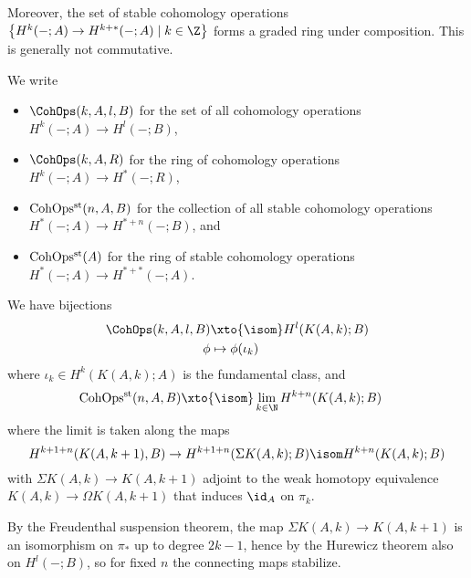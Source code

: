 Moreover, the set of stable cohomology operations $\big\{H^k({{-}}; A) \to H^{k + *}({{-}}; A) \mid k \in \Z\big\}$ forms a graded ring under composition.
This is generally not commutative.
\begin{notation}
	We write
	\begin{itemize}
		\item $\CohOps(k, A, l, B)$ for the set of all cohomology operations $H^k({{-}}; A) \to H^l({{-}}; B)$,
		\item $\CohOps(k, A, R)$ for the ring of cohomology operations $H^k({{-}}; A) \to H^*({{-}}; R)$,
		\item $\operatorname{CohOps^{\mathrm{st}}}(n, A, B)$ for the collection of all stable cohomology operations $H^*({{-}}; A) \to H^{* + n}({{-}}; B)$, and
		\item $\operatorname{CohOps^{\mathrm{st}}}(A)$ for the ring of stable cohomology operations $H^*({{-}}; A) \to H^{* + *}({{-}}; A)$.
	\end{itemize}
\end{notation}
\begin{proposition}\label{prp:cohopsbijections}
	We have bijections
	\begin{align*}
		\CohOps(k, A, l, B) &\xto{\isom} H^l(K(A, k); B) \\
		\phi &\mapsto \phi(\iota_k)
	\end{align*}
	where $\iota_k \in H^k(K(A, k); A)$ is the fundamental class, and
	\begin{align*}
		\CohOpsst(n, A, B) &\xto{\isom} \lim_{k \in \N} H^{k + n}(K(A, k); B)
	\end{align*}
	where the limit is taken along the maps
	\begin{equation*}
		H^{k + 1 + n}(K(A, k + 1), B) \to H^{k + 1 + n}(\Sigma K(A, k); B) \isom H^{k + n}(K(A, k); B)
	\end{equation*}
	with $\Sigma K(A, k) \to K(A, k + 1)$ adjoint to the weak homotopy equivalence $K(A, k) \to \Omega K(A, k + 1)$ that induces $\id_A$ on $\pi_k$.
\end{proposition}
\begin{remark}
	By the Freudenthal suspension theorem, the map $\Sigma K(A, k) \to K(A, k + 1)$ is an isomorphism on $\pi_*$ up to degree $2k - 1$, hence by the Hurewicz theorem also on $H^l({{-}}; B)$, so for fixed $n$ the connecting maps stabilize.
\end{remark}
